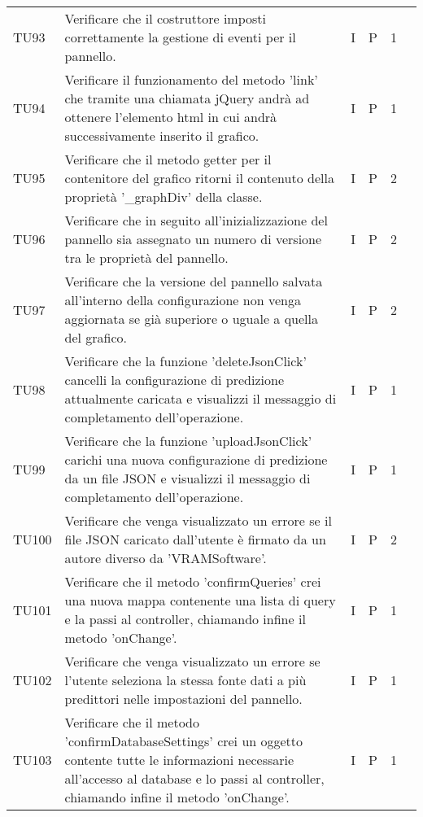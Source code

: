 \begin{longtable} {
		>{}p{12mm}
		>{}p{79.5mm}
		>{}p{9mm}
		>{}p{8mm}
		>{}p{14mm}
		>{}p{0mm}}
	TU93		& Verificare che il costruttore imposti correttamente la gestione di eventi per il pannello. & I & P & 1 & \TBstrut \\ [2mm]
	TU94		& Verificare il funzionamento del metodo 'link' che tramite una chiamata jQuery andrà ad ottenere l'elemento html in cui andrà successivamente inserito il grafico. & I & P & 1 & \TBstrut \\ [2mm]
	TU95		& Verificare che il metodo getter per il contenitore del grafico ritorni il contenuto della proprietà '\_graphDiv' della classe. & I & P & 2 & \TBstrut \\ [2mm]
	TU96		& Verificare che in seguito all'inizializzazione del pannello sia assegnato un numero di versione tra le proprietà del pannello. & I & P & 2 & \TBstrut \\ [2mm]
	TU97		& Verificare che la versione del pannello salvata all'interno della configurazione non venga aggiornata se già superiore o uguale a quella del grafico. & I & P & 2 & \TBstrut \\ [2mm]
	TU98		& Verificare che la funzione 'deleteJsonClick' cancelli la configurazione di predizione attualmente caricata e visualizzi il messaggio di completamento dell'operazione. & I & P & 1 & \TBstrut \\ [2mm]
	TU99		& Verificare che la funzione 'uploadJsonClick' carichi una nuova configurazione di predizione da un file JSON e visualizzi il messaggio di completamento dell'operazione. & I & P & 1 & \TBstrut \\ [2mm]
	TU100		& Verificare che venga visualizzato un errore se il file JSON caricato dall'utente è firmato da un autore diverso da 'VRAMSoftware'. & I & P & 2 & \TBstrut \\ [2mm]
	TU101		& Verificare che il metodo 'confirmQueries' crei una nuova mappa contenente una lista di query e la passi al controller, chiamando infine il metodo 'onChange'. & I & P & 1 & \TBstrut \\ [2mm]
	TU102		& Verificare che venga visualizzato un errore se l'utente seleziona la stessa fonte dati a più predittori nelle impostazioni del pannello. & I & P & 1 & \TBstrut \\ [2mm]
	TU103		& Verificare che il metodo 'confirmDatabaseSettings' crei un oggetto contente tutte le informazioni necessarie all'accesso al database e lo passi al controller, chiamando infine il metodo 'onChange'. & I & P & 1 & \TBstrut \\ [2mm]

\end{longtable}
